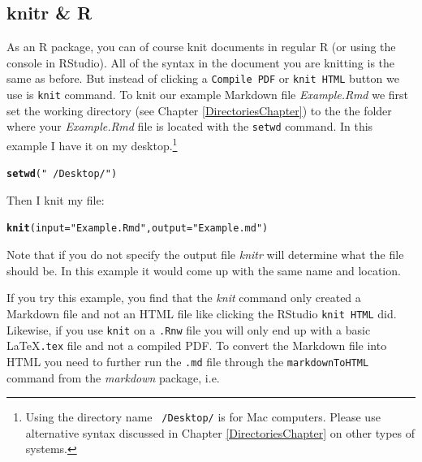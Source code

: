 \documentclass[ChapterTOCs,krantz1]{krantz}\usepackage{graphicx, color}
\makeatletter
\newcommand{\hlfunctioncall}[1]{\textcolor[rgb]{0.501960784313725,0,0.329411764705882}{\textbf{#1}}}%
\newcommand{\hlstring}[1]{\textcolor[rgb]{0.6,0.6,1}{#1}}%
\newenvironment{kframe}{%
 \def\at@end@of@kframe{}%
 \ifinner\ifhmode%
  \def\at@end@of@kframe{\end{minipage}}%
  \begin{minipage}{\columnwidth}%
 \fi\fi%
 \def\FrameCommand##1{\hskip\@totalleftmargin \hskip-\fboxsep
 \colorbox{shadecolor}{##1}\hskip-\fboxsep
     \hskip-\linewidth \hskip-\@totalleftmargin \hskip\columnwidth}%
 \MakeFramed {\advance\hsize-\width
   \@totalleftmargin\z@ \linewidth\hsize
   \@setminipage}}%
 {\par\unskip\endMakeFramed%
 \at@end@of@kframe}
\newenvironment{knitrout}{}{} %
\makeatother
\begin{document}
\subsection{knitr \& R}

As an R package, you can of course knit documents in regular R (or using the console in RStudio). All of the syntax in the document you are knitting is the same as before. But instead of clicking a {\tt{Compile PDF}} or {\tt{knit HTML}} button we use is {\tt{knit}} command. To knit our example Markdown file {\emph{Example.Rmd}} we first set the working directory (see Chapter \ref{DirectoriesChapter}) to the the folder where your {\emph{Example.Rmd}} file is located with the {\tt{setwd}} command. In this example I have it on my desktop.\footnote{Using the directory name {\tt{~/Desktop/}} is for Mac computers. Please use alternative syntax discussed in Chapter \ref{DirectoriesChapter} on other types of systems.}

\begin{knitrout}
\color{fgcolor}\begin{kframe}
\begin{alltt}
\hlfunctioncall{setwd}(\hlstring{"~/Desktop/"})
\end{alltt}
\end{kframe}
\end{knitrout}


\noindent Then I knit my file:

\begin{knitrout}
\color{fgcolor}\begin{kframe}
\begin{alltt}
\hlfunctioncall{knit}(input = \hlstring{"Example.Rmd"}, output = \hlstring{"Example.md"})
\end{alltt}
\end{kframe}
\end{knitrout}


\noindent Note that if you do not specify the output file {\emph{knitr}} will determine what the file should be. In this example it would come up with the same name and location.

If you try this example, you find that the {\emph{knit}} command only created a Markdown file and not an HTML file like clicking the RStudio {\tt{knit HTML}} did. Likewise, if you use {\tt{knit}} on a {\tt{.Rnw}} file you will only end up with a basic \LaTeX {\tt{.tex}} file and not a compiled PDF. To convert the Markdown file into HTML you need to further run the {\tt{.md}} file through the {\tt{markdownToHTML}} command from the {\emph{markdown}} package, i.e.
\end{document}
